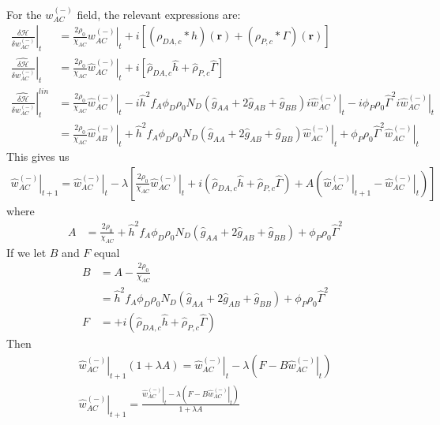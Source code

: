 \documentclass{article}
\begin{document}
  For the $w_{AC}^{(-)}$ field, the relevant expressions are:
  \begin{align*}
    \left. \frac{\delta \mathcal{H}}{\delta  w_{AC}^{(-)} } \right|_t &=
      \frac{2\rho_0}{\chi_{AC}} \left. w_{AC}^{(-)} \right|_t
      + i [ (\rho_{DA,c} \ast h)(\mathbf{r})
            + (\rho_{P,c} \ast \Gamma)(\mathbf{r}) ] \\
      \left. \hat{\frac{\delta \mathcal{H}}{\delta w_{AC}^{(-)}}} \right|_t &=
      \frac{2\rho_0}{\chi_{AC}} \left. \hat{w}_{AC}^{(-)} \right|_t
      + i [ \hat{\rho}_{DA,c} \hat{h}
            + \hat{\rho}_{P,c}  \hat{\Gamma} ] \\
    \left. \hat{\frac{\delta \mathcal{H}}{\delta w_{AC}^{(-)}}} \right| ^{lin}_t &=
      \frac{2\rho_0}{\chi_{AC}} \left. \hat{w}_{AC}^{(-)} \right|_t
      - i \hat{h}^2 f_A \phi_D \rho_0 N_D
        (\hat{g}_{AA} + 2 \hat{g}_{AB} + \hat{g}_{BB}) i \left.
          \hat{w}_{AC}^{(-)} \right|_t
      - i \phi_P \rho_0 \hat{\Gamma}^2 i \left. \hat{w}_{AC}^{(-)} \right|_t \\
    &= \frac{2\rho_0}{\chi_{AC}} \left. \hat{w}_{AB}^{(-)} \right|_t
      + \hat{h}^2 f_A \phi_D \rho_0 N_D
        (\hat{g}_{AA} + 2 \hat{g}_{AB} + \hat{g}_{BB})
          \left. \hat{w}_{AC}^{(-)} \right|_t
      + \phi_P \rho_0 \hat{\Gamma}^2 \left. \hat{w}_{AC}^{(-)} \right|_t
  \end{align*}
  This gives us
  \begin{align*}
    \left. \hat{w}_{AC}^{(-)} \right|_{t+1} =
      \left. \hat{w}_{AC}^{(-)} \right|_t - \lambda \left[
        \frac{2\rho_0}{\chi_{AC}} \left. \hat{w}_{AC}^{(-)} \right|_t
        + i ( \hat{\rho}_{DA,c} \hat{h}
              + \hat{\rho}_{P,c}  \hat{\Gamma} )
        + A ( \left. \hat{w}_{AC}^{(-)} \right|_{t+1}
              - \left. \hat{w}_{AC}^{(-)} \right|_t)
      \right]
  \end{align*}
  where
  \begin{align*}
    A &=
    \frac{2\rho_0}{\chi_{AC}}
        + \hat{h}^2 f_A \phi_D \rho_0 N_D
          (\hat{g}_{AA} + 2 \hat{g}_{AB} + \hat{g}_{BB})
        + \phi_P \rho_0 \hat{\Gamma}^2
  \end{align*}
  If we let $B$ and $F$ equal
  \begin{align*}
    B &= A - \frac{2\rho_0}{\chi_{AC}} \\
      &= \hat{h}^2 f_A \phi_D \rho_0 N_D
          (\hat{g}_{AA} + 2 \hat{g}_{AB} + \hat{g}_{BB})
        + \phi_P \rho_0 \hat{\Gamma}^2 \\
    F &= + i ( \hat{\rho}_{DA,c} \hat{h}
              + \hat{\rho}_{P,c}  \hat{\Gamma} )
  \end{align*}
  Then
  \begin{align*}
    \left. \hat{w}_{AC}^{(-)} \right|_{t+1} ( 1 + \lambda A ) =
      \left. \hat{w}_{AC}^{(-)} \right|_t
      - \lambda \left( F - B \left. \hat{w}_{AC}^{(-)} \right|_t \right) \\
    \left. \hat{w}_{AC}^{(-)} \right|_{t+1} =
    \frac{\left. \hat{w}_{AC}^{(-)} \right|_t - \lambda
            \left( F - B \left. \hat{w}_{AC}^{(-)} \right|_t \right)}
         {1 + \lambda A}
  \end{align*}
  
\end{document}
